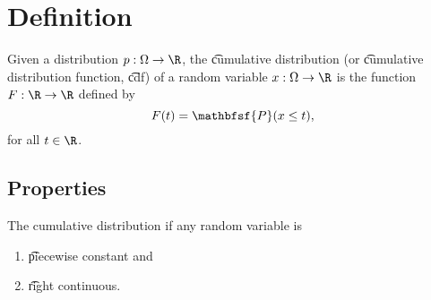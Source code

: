
\section*{Definition}

Given a distribution $p: \Omega  \to \R $, the \t{cumulative distribution} (or \t{cumulative distribution function}, \t{cdf}) of a random variable $x: \Omega  \to \R $ is the function $F: \R \to \R $ defined by
  \[
F(t) = \mathbfsf{P} (x \leq t),
  \]
for all $t \in \R $.

\subsection*{Properties}

The cumulative distribution if any random variable is
  \begin{enumerate}
  \item \t{piecewise constant} and
  \item \t{right continuous}.
  \end{enumerate}

\blankpage